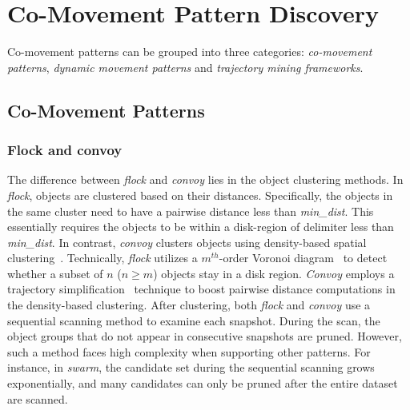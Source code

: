 \section{Co-Movement Pattern Discovery}
\label{sec:related_work:trajectory}
Co-movement patterns can be grouped into three categories: \emph{co-movement patterns},
\emph{dynamic movement patterns} and \emph{trajectory mining frameworks}.
\subsection{Co-Movement Patterns}
\subsubsection{Flock and convoy}
The difference between \emph{flock} and \emph{convoy} lies 
in the object clustering methods. In \emph{flock},
objects are clustered based on their distances. Specifically, the
objects in the same cluster need to have a pairwise distance less than \emph{min\_dist}. 
This essentially requires the objects to be within a disk-region of delimiter less than \emph{min\_dist}.  
In contrast, \emph{convoy} clusters objects using density-based spatial clustering~\cite{ester1996density}.
Technically, \emph{flock} utilizes a $m^{th}$-order Voronoi diagram~\cite{laube2005finding} to detect whether
a subset of $n$ ($n \geq m$) objects stay in a disk region.
\emph{Convoy} employs
a trajectory simplification~\cite{douglas1973linesimplification} technique to boost pairwise distance computations in
the density-based clustering.
After clustering, both \emph{flock} and \emph{convoy} use a sequential scanning
method to examine each snapshot. 
During the scan, the object groups that do 
not appear in consecutive snapshots are pruned.
However, such a method faces high complexity when supporting other patterns.
For instance, in \emph{swarm}, the candidate set during the sequential scanning grows
exponentially, and many candidates can only be pruned after the entire dataset are scanned.

